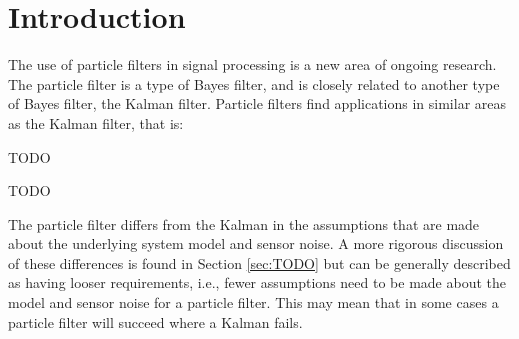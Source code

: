 \section{Introduction}
The use of particle filters in signal processing is a new area of ongoing
research. The particle filter is a type of Bayes filter, and is closely related
to another type of Bayes filter, the Kalman filter. Particle filters find
applications in similar areas as the Kalman filter, that is:
\begin{compactitem}
\item TODO
\item TODO
\end{compactitem}
The particle filter differs from the Kalman in the assumptions that are made
about the underlying system model and sensor noise. A more rigorous discussion
of these differences is found in Section \ref{sec:TODO} but can be generally
described as having looser requirements, i.e., fewer assumptions need to be made
about the model and sensor noise for a particle filter. This may mean that in
some cases a particle filter will succeed where a Kalman fails.